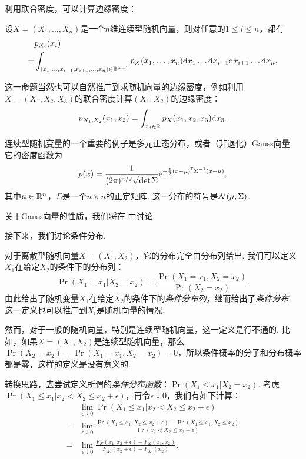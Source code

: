 利用联合密度，可以计算边缘密度：
\begin{theorem}\label{theorem:continuous-marginal}
    设$X=(X_1,\dots,X_n)$是一个$n$维连续型随机向量，则对任意的$1\leq i\leq n$，都有
    \begin{align*}
        &p_{X_i}(x_i)\\
        =&\int_{(x_1,\dots,x_{i-1},x_{i+1},\dots,x_n)\in\mathbb{R}^{n-1}}p_X(x_1,\dots,x_n)\mathrm{d} x_1\dots\mathrm{d} x_{i-1}\mathrm{d} x_{i+1}\dots\mathrm{d} x_n.
    \end{align*}
\end{theorem}

这一命题当然也可以自然推广到求随机向量的边缘密度，例如利用$X=(X_1,X_2,X_3)$的联合密度计算$(X_1,X_2)$的边缘密度：
\[
    p_{X_1,X_2}(x_1,x_2) = \int_{x_3\in\mathbb{R}}p_X(x_1,x_2,x_3)\mathrm{d} x_3.
\]

连续型随机变量的一个重要的例子是多元正态分布，或者（非退化）Gauss向量. 它的密度函数为
\[p(x)=\frac{1}{(2\pi)^{n/2}\sqrt{\det\Sigma}}\mathrm{e}^{-\frac{1}{2}(x-\mu)^{\mathsf{T}}\Sigma^{-1}(x-\mu)},\]
其中$\mu\in\mathbb{R}^n$，$\Sigma$是一个$n\times n$的正定矩阵. 这一分布的符号是$\mathcal{N}(\mu,\Sigma)$. 

关于Gauss向量的性质，我们将在 中讨论. 

接下来，我们讨论条件分布. 

对于离散型随机向量$X=(X_1,X_2)$，它的分布完全由分布列给出. 我们可以定义$X_1$在给定$X_2$的条件下的分布列：
\[\Pr(X_1=x_1|X_2=x_2)=\frac{\Pr(X_1=x_1,X_2=x_2)}{\Pr(X_2=x_2)}.\]
由此给出了随机变量$X_1$在给定$X_2$的条件下的\textit{条件分布列}，继而给出了\textit{条件分布}. 这一定义也可以推广到$X_i$是随机向量的情况. 

然而，对于一般的随机向量，特别是连续型随机向量，这一定义是行不通的. 比如，如果$X=(X_1,X_2)$是连续型随机向量，那么 $\Pr(X_2=x_2)=\Pr(X_1=x_1,X_2=x_2)=0$，所以条件概率的分子和分布概率都是零，这样的定义是没有意义的. 

转换思路，去尝试定义所谓的\textit{条件分布函数}：$\Pr(X_1\leq x_1|X_2=x_2)$. 考虑$\Pr(X_1\leq x_1|x_2< X_2\leq x_2+\epsilon)$，再令$\epsilon\downarrow 0$，我们有如下计算：
\begin{align*}
    &\lim_{\epsilon\downarrow 0}\Pr(X_1\leq x_1|x_2< X_2\leq x_2+\epsilon) \\
    =&\lim_{\epsilon\downarrow 0}\frac{\Pr(X_1\leq x_1,X_2\leq x_2+\epsilon)-\Pr(X_1\leq x_1,X_2\leq x_2)}{\Pr(x_2< X_2\leq x_2+\epsilon)}\\
    =&\lim_{\epsilon\downarrow 0}\frac{F_X(x_1,x_2+\epsilon)-F_X(x_1,x_2)}{F_{X_2}(x_2+\epsilon)-F_{X_2}(x_2)}.
\end{align*}

